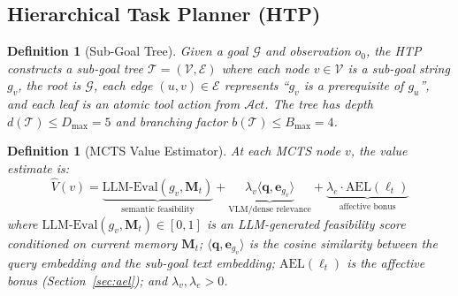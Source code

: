 \documentclass[10pt,conference]{IEEEtran}
\theoremstyle{ieeethm}
\theoremstyle{ieeedef}
\newtheorem{definition}[theorem]{Definition}
\theoremstyle{ieeeremark}
\begin{document}
\subsection{Hierarchical Task Planner (HTP)}
\label{sec:htp}

\begin{definition}[Sub-Goal Tree]
\label{def:subtree}
Given a goal $\mathcal{G}$ and observation $o_0$, the HTP constructs a sub-goal tree $\mathcal{T} = (\mathcal{V}, \mathcal{E})$ where each node $v \in \mathcal{V}$ is a sub-goal string $g_v$, the root is $\mathcal{G}$, each edge $(u,v) \in \mathcal{E}$ represents ``$g_v$ is a prerequisite of $g_u$'', and each leaf is an atomic tool action from $\mathcal{A}ct$. The tree has depth $d(\mathcal{T}) \leq D_\text{max} = 5$ and branching factor $b(\mathcal{T}) \leq B_\text{max} = 4$.
\end{definition}

\begin{definition}[MCTS Value Estimator]
\label{def:mcts_value}
At each MCTS node $v$, the value estimate is:
\begin{equation}
\hat{V}(v) = \underbrace{\text{LLM-Eval}(g_v, \mathbf{M}_t)}_{\text{semantic feasibility}}
           + \underbrace{\lambda_v \langle \mathbf{q}, \mathbf{e}_{g_v} \rangle}_{\text{VLM/dense relevance}}
           + \underbrace{\lambda_e \cdot \text{AEL}(\ell_t)}_{\text{affective bonus}}
\label{eq:mcts_value}
\end{equation}
where $\text{LLM-Eval}(g_v, \mathbf{M}_t) \in [0,1]$ is an LLM-generated feasibility score conditioned on current memory $\mathbf{M}_t$; $\langle \mathbf{q}, \mathbf{e}_{g_v} \rangle$ is the cosine similarity between the query embedding and the sub-goal text embedding; $\text{AEL}(\ell_t)$ is the affective bonus (Section~\ref{sec:ael}); and $\lambda_v, \lambda_e > 0$.
\end{definition}
\end{document}
